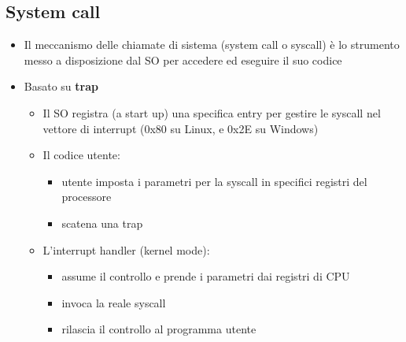 \subsection{System call}
\begin{itemize}
\item Il meccanismo delle chiamate di sistema (system call o syscall) è lo strumento messo a disposizione dal SO per accedere ed eseguire il suo codice
\item Basato su \textbf{trap}
 \begin{itemize}
 \item Il SO registra (a start up) una specifica entry per gestire le syscall nel vettore di interrupt (0x80 su Linux, e 0x2E su Windows)
 \item Il codice utente: 
  \begin{itemize}
  \item utente imposta i parametri per la syscall in specifici registri del processore
  \item scatena una trap
  \end{itemize}
 \item L'interrupt handler (kernel mode):
  \begin{itemize}
  \item assume il controllo e prende i parametri dai registri  di CPU
  \item invoca la reale syscall
  \item rilascia il controllo al programma utente 
  \end{itemize}
 \end{itemize}
\end{itemize}